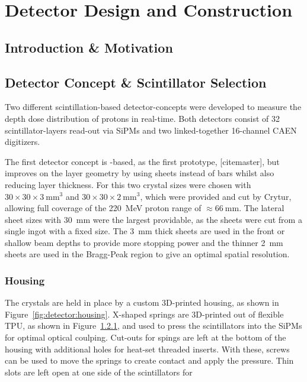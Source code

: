 \chapter{Detector Design and Construction}\label{chapter:setup}

\section{Introduction \& Motivation}

\section{Detector Concept \& Scintillator Selection}\label{section:detector:concept}
Two different scintillation-based detector-concepts were developed to measure the depth dose distribution of protons in real-time.
Both detectors consist of 32 scintillator-layers read-out via \glspl{SiPM} and two linked-together 16-channel CAEN digitizers.

The first detector concept is -based, as the first prototype,  [citemaster], but improves on the layer geometry by using sheets instead of bars whilst also reducing layer thickness.
For this two crystal sizes were chosen with $30\times30\times3~\text{mm}^3$ and $30\times30\times2~\text{mm}^3$, which were provided and cut by Crytur, allowing full coverage of the \SI{220}{\mega\electronvolt} proton range of $\approx \SI{66}{\mm}$.
The lateral sheet sizes with \SI{30}{\mm} were the largest providable, as the sheets were cut from a single ingot with a fixed size.
The \SI{3}{\mm} thick sheets are used in the front or shallow beam depths to provide more stopping power and the thinner \SI{2}{\mm} sheets are used in the Bragg-Peak region to give an optimal spatial resolution.

\subsection{Housing}
The crystals are held in place by a custom 3D-printed housing, as shown in Figure~\ref{fig:detector:housing}.
X-shaped springs are 3D-printed out of flexible TPU, as shown in Figure~\ref{}, and used to press the scintillators into the \glspl{SiPM} for optimal optical coulping.
Cut-outs for spings are left at the bottom of the housing with additional holes for heat-set threaded inserts.
With these, screws can be used to move the springs to create contact and apply the pressure.
Thin slots are left open at one side of the scintillators for  


